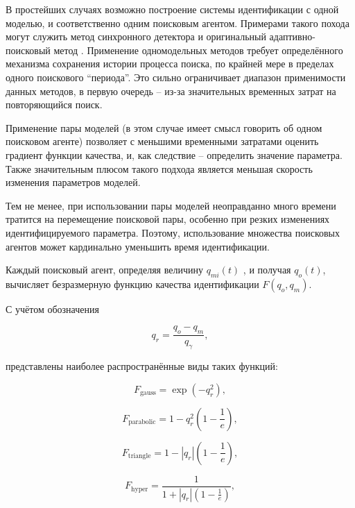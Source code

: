 \documentclass[a4paper,paratype,12pt,fouriernc]{cmonogra}
\begin{document}
В простейших случаях возможно построение системы идентификации
с одной моделью, и соответственно одним поисковым агентом.
Примерами такого похода могут служить
метод синхронного детектора \cite{adopt_cont_sys}
и оригинальный адаптивно-поисковый метод \cite{mich_92}.
Применение одномодельных методов требует определённого механизма
сохранения истории процесса поиска, по крайней мере в пределах
одного поискового ``периода''. Это сильно ограничивает диапазон
применимости данных методов, в первую очередь -- из-за значительных
временных затрат на повторяющийся поиск.

Применение пары моделей \cite{atu_asau3}
(в этом случае имеет смысл говорить об одном поисковом агенте)
позволяет с меньшими временными затратами оценить градиент функции качества,
и, как следствие -- определить значение параметра. Также значительным плюсом
такого подхода является меньшая скорость изменения параметров моделей.

Тем не менее, при использовании пары моделей неоправданно много времени
тратится на перемещение поисковой пары, особенно при резких изменениях
идентифицируемого параметра. Поэтому, использование множества
поисковых агентов может кардинально уменьшить время идентификации.

Каждый поисковый агент, определяя величину $q_{mi}(t)$ , и получая $q_o(t)$,
вычисляет безразмерную функцию качества идентификации
$F(q_o,q_m)$.

С учётом обозначения

\[
  q_r = \frac{q_o - q_m}{q_\gamma},
\]

\noindent
представлены наиболее распространённые виды таких функций:

\begin{equation}
  F_{\mathrm{gauss}} = \exp( - q_r^2 ),
\label{atu:eq:F_gauss}
\end{equation}

\begin{equation}
  F_{\mathrm{parabolic}} = 1 - q_r^2 \left( 1 - \frac{1}{e} \right),
\label{atu:eq:F_parabolic}
\end{equation}

\begin{equation}
  F_{\mathrm{triangle}} = 1 - |q_r| \left( 1 - \frac{1}{e} \right),
\label{atu:eq:F_triangle}
\end{equation}

\begin{equation}
  F_{\mathrm{hyper}} = \frac{1}{ 1 + |q_r| \left( 1 - \frac{1}{e} \right)},
\label{atu:eq:F_hyper}
\end{equation}
\end{document}
